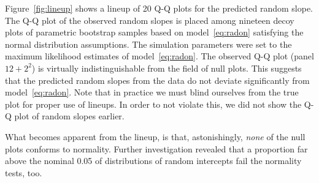 \documentclass[11pt]{article} %
\begin{document}
Figure~\ref{fig:lineup} shows a lineup \citep{buja:2009} of 20 Q-Q plots for the predicted random slope. The Q-Q plot of the observed random slopes is placed among nineteen decoy plots of parametric bootstrap samples based on model~\eqref{eq:radon} satisfying the normal distribution assumptions. The simulation parameters were set to the maximum likelihood estimates of model~\eqref{eq:radon}.
The observed Q-Q plot (panel $12+2^2$) is virtually indistinguishable from the field of null plots. This suggests that the predicted random slopes  from the data do not deviate significantly from model~\eqref{eq:radon}. 
Note that in practice we must blind ourselves from the true plot for proper use of lineups. In order to not violate this, we did not show the Q-Q plot of random slopes earlier.
%
%

What becomes apparent from the lineup, is that, astonishingly, {\it none} of the null plots conforms to normality. Further investigation  revealed  that a  proportion far above the nominal 0.05 of distributions of random intercepts  fail the normality tests, too.


\end{document}
